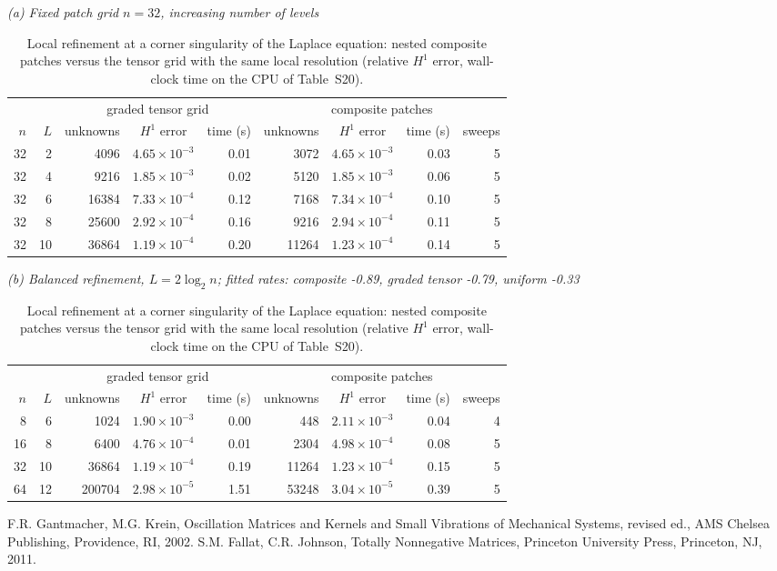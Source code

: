 \documentclass[11pt]{article}
\newif\ifincludeproof \includeprooftrue
\begin{document}
\begin{table}[htbp]\centering\footnotesize\setlength{\tabcolsep}{4pt}
\caption{Local refinement at a corner singularity of the Laplace equation: nested composite patches
versus the tensor grid with the same local resolution (relative $H^1$ error, wall-clock time on the CPU of
Table~S20).}
\textit{(a) Fixed patch grid $n=32$, increasing number of levels}\\[2pt]
\begin{tabular}{rr rcr rcrr}
\toprule
 & & \multicolumn{3}{c}{graded tensor grid} & \multicolumn{4}{c}{composite patches}\\
\cmidrule(lr){3-5}\cmidrule(lr){6-9}
$n$ & $L$ & unknowns & $H^1$ error & time (s) & unknowns & $H^1$ error & time (s) & sweeps\\
\midrule
32 & 2 & 4096 & $4.65{\times}10^{-3}$ & 0.01 & 3072 & $4.65{\times}10^{-3}$ & 0.03 & 5\\
32 & 4 & 9216 & $1.85{\times}10^{-3}$ & 0.02 & 5120 & $1.85{\times}10^{-3}$ & 0.06 & 5\\
32 & 6 & 16384 & $7.33{\times}10^{-4}$ & 0.12 & 7168 & $7.34{\times}10^{-4}$ & 0.10 & 5\\
32 & 8 & 25600 & $2.92{\times}10^{-4}$ & 0.16 & 9216 & $2.94{\times}10^{-4}$ & 0.11 & 5\\
32 & 10 & 36864 & $1.19{\times}10^{-4}$ & 0.20 & 11264 & $1.23{\times}10^{-4}$ & 0.14 & 5\\
\bottomrule
\end{tabular}

\medskip
\textit{(b) Balanced refinement, $L=2\log_2n$; fitted rates: composite -0.89, graded tensor -0.79, uniform -0.33}\\[2pt]
\begin{tabular}{rr rcr rcrr}
\toprule
 & & \multicolumn{3}{c}{graded tensor grid} & \multicolumn{4}{c}{composite patches}\\
\cmidrule(lr){3-5}\cmidrule(lr){6-9}
$n$ & $L$ & unknowns & $H^1$ error & time (s) & unknowns & $H^1$ error & time (s) & sweeps\\
\midrule
8 & 6 & 1024 & $1.90{\times}10^{-3}$ & 0.00 & 448 & $2.11{\times}10^{-3}$ & 0.04 & 4\\
16 & 8 & 6400 & $4.76{\times}10^{-4}$ & 0.01 & 2304 & $4.98{\times}10^{-4}$ & 0.08 & 5\\
32 & 10 & 36864 & $1.19{\times}10^{-4}$ & 0.19 & 11264 & $1.23{\times}10^{-4}$ & 0.15 & 5\\
64 & 12 & 200704 & $2.98{\times}10^{-5}$ & 1.51 & 53248 & $3.04{\times}10^{-5}$ & 0.39 & 5\\
\bottomrule
\end{tabular}
\end{table}

\ifincludeproof
\begin{thebibliography}{9}
 F.R. Gantmacher, M.G. Krein, Oscillation Matrices and Kernels and Small Vibrations of Mechanical Systems, revised ed., AMS Chelsea Publishing, Providence, RI, 2002.
 S.M. Fallat, C.R. Johnson, Totally Nonnegative Matrices, Princeton University Press, Princeton, NJ, 2011.
\end{thebibliography}
\fi
\end{document}
